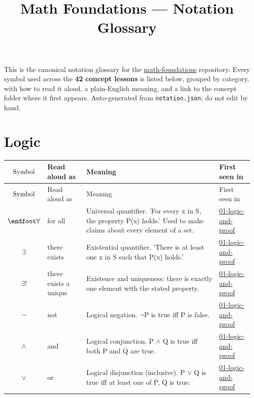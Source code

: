 \documentclass[10pt]{article}
\title{Math Foundations --- Notation Glossary}
\author{}
\date{}
\begin{document}
\maketitle
\thispagestyle{empty}

\noindent
This is the canonical notation glossary for the
\href{https://github.com/pleyva2004/math-foundations}{math-foundations} repository.
Every symbol used across the \textbf{42 concept lessons} is listed below, grouped by category,
with how to read it aloud, a plain-English meaning, and a link to the concept folder where it
first appears. Auto-generated from \texttt{notation.json}; do not edit by hand.


\section*{Logic}
\begin{longtable}{@{} >{$}c<{$} l p{6.5cm} l @{}}
\toprule
\textnormal{Symbol} & Read aloud as & Meaning & First seen in \\
\midrule
\endfirsthead
\toprule
\textnormal{Symbol} & Read aloud as & Meaning & First seen in \\
\midrule
\endhead
\bottomrule
\endfoot
\forall & for all & Universal quantifier. 'For every x in S, the property P(x) holds.' Used to make claims about every element of a set. & \href{https://github.com/pleyva2004/math-foundations/tree/main/concepts/01-logic-and-proof}{01-logic-and-proof} \\
\exists & there exists & Existential quantifier. 'There is at least one x in S such that P(x) holds.' & \href{https://github.com/pleyva2004/math-foundations/tree/main/concepts/01-logic-and-proof}{01-logic-and-proof} \\
\exists! & there exists a unique & Existence and uniqueness: there is exactly one element with the stated property. & \href{https://github.com/pleyva2004/math-foundations/tree/main/concepts/01-logic-and-proof}{01-logic-and-proof} \\
\neg & not & Logical negation. $\neg$P is true iff P is false. & \href{https://github.com/pleyva2004/math-foundations/tree/main/concepts/01-logic-and-proof}{01-logic-and-proof} \\
\wedge & and & Logical conjunction. P $\wedge$ Q is true iff both P and Q are true. & \href{https://github.com/pleyva2004/math-foundations/tree/main/concepts/01-logic-and-proof}{01-logic-and-proof} \\
\vee & or & Logical disjunction (inclusive). P $\vee$ Q is true iff at least one of P, Q is true. & \href{https://github.com/pleyva2004/math-foundations/tree/main/concepts/01-logic-and-proof}{01-logic-and-proof} \\

\end{longtable}
\end{document}
